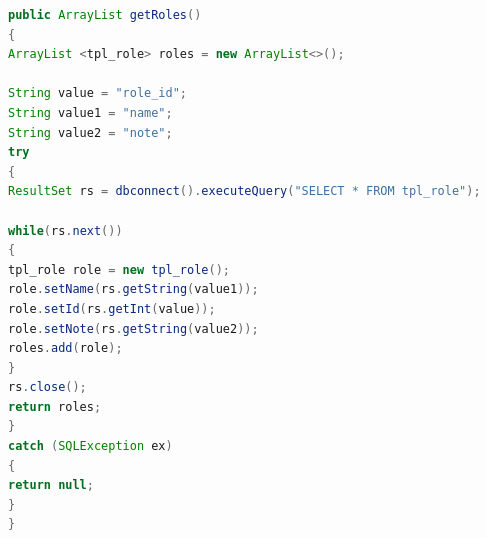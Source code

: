 \newpage


\begin{lstlisting}[language=JAVA, caption=Datenbankanbindung.java/Methode-getRoles, firstnumber=59]
public ArrayList getRoles()
{
ArrayList <tpl_role> roles = new ArrayList<>();

String value = "role_id";
String value1 = "name";
String value2 = "note";
try 
{
ResultSet rs = dbconnect().executeQuery("SELECT * FROM tpl_role");

while(rs.next())
{
tpl_role role = new tpl_role();
role.setName(rs.getString(value1));
role.setId(rs.getInt(value));
role.setNote(rs.getString(value2));
roles.add(role);
}
rs.close();
return roles;
} 
catch (SQLException ex) 
{
return null;
}
}
\end{lstlisting}

\renewcommand{\arraystretch}{1}

\newpage

